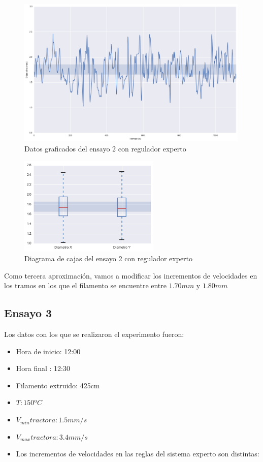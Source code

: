 \begin{figure}[H]
    \centering
    \includegraphics[width=0.99\textwidth]{images/producciones/12082015/output_9_e1.png}
    \caption{Datos graficados del ensayo 2 con regulador experto}
    \label{fig:reg_graf2}
\end{figure}

\begin{figure}[H]
    \centering
    \includegraphics[width=0.6\textwidth]{images/producciones/12082015/output_10_e1.png}
    \caption{Diagrama de cajas del ensayo 2 con regulador experto}
    \label{fig:reg_cajas2}
\end{figure}

Como tercera aproximación, vamos a modificar los incrementos de velocidades en los tramos en los que el filamento se encuentre entre  $1.70 mm$ y $1.80 mm$

\subsection{Ensayo 3}

Los datos con los que se realizaron el experimento fueron:

\begin{itemize}
	\item{Hora de inicio: 12:00}
	\item{Hora final : 12:30}
	\item{Filamento extruido: 425cm}
	\item{$T: 150ºC$}
	\item{$V_{min} tractora: 1.5 mm/s$}
	\item{$V_{max} tractora: 3.4 mm/s$}
	\item{Los incrementos de velocidades en las reglas del sistema experto son distintas:}
\end{itemize}

